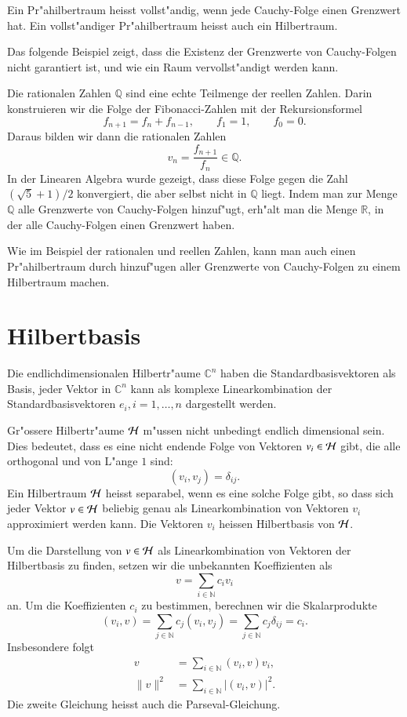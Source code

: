 \begin{definition}
Ein Pr"ahilbertraum heisst vollst"andig, wenn jede Cauchy-Folge einen
Grenzwert hat.
Ein vollst"andiger Pr"ahilbertraum heisst auch ein Hilbertraum.
\end{definition}

Das folgende Beispiel zeigt, dass die Existenz der Grenzwerte von
Cauchy-Folgen nicht garantiert ist, und wie ein Raum vervollst"andigt
werden kann.

\begin{beispiel}
Die rationalen Zahlen $\mathbb Q$ sind eine echte Teilmenge der
reellen Zahlen.
Darin konstruieren wir die Folge der Fibonacci-Zahlen mit der 
Rekursionsformel
\[
f_{n+1}=f_n+f_{n-1},\qquad f_1=1, \qquad f_0=0.
\]
Daraus bilden wir dann die rationalen Zahlen
\[
v_n=\frac{f_{n+1}}{f_n}\in\mathbb Q.
\]
In der Linearen Algebra wurde gezeigt, dass diese Folge gegen
die Zahl $(\sqrt{5}+1)/2$ konvergiert, die aber selbst nicht in
$\mathbb Q$ liegt. Indem man zur Menge $\mathbb Q$ alle Grenzwerte
von Cauchy-Folgen hinzuf"ugt, erh"alt man die Menge $\mathbb R$, in der
alle Cauchy-Folgen einen Grenzwert haben.
\end{beispiel}

Wie im Beispiel der rationalen und reellen Zahlen,
kann man auch einen Pr"ahilbertraum durch hinzuf"ugen aller Grenzwerte
von Cauchy-Folgen zu einem Hilbertraum machen.

\section{Hilbertbasis}
Die endlichdimensionalen Hilbertr"aume $\mathbb C^n$ haben die
Standardbasisvektoren als Basis, jeder Vektor in $\mathbb C^n$
kann als komplexe Linearkombination der Standardbasisvektoren
$e_i,i=1,\dots,n$ dargestellt werden.

Gr"ossere Hilbertr"aume $\cal H$ m"ussen nicht unbedingt endlich dimensional
sein. Dies bedeutet, dass es eine nicht endende Folge von Vektoren
$v_i\in\cal H$ gibt, die alle orthogonal und von L"ange $1$ sind:
\[
(v_i,v_j)=\delta_{ij}.
\]
Ein Hilbertraum $\cal H$ heisst separabel, wenn es eine solche Folge
gibt, so dass sich jeder Vektor $v\in\cal H$ beliebig genau als
Linearkombination von Vektoren $v_i$ approximiert werden kann.
Die Vektoren $v_i$ heissen Hilbertbasis von $\cal H$.

Um die Darstellung von $v\in\cal H$ als Linearkombination von Vektoren
der Hilbertbasis zu finden, setzen wir die unbekannten Koeffizienten
als 
\[
v=\sum_{i\in\mathbb N}c_iv_i
\]
an. Um die Koeffizienten $c_i$ zu bestimmen, berechnen wir die
Skalarprodukte
\[
(v_i,v)
=\sum_{j\in\mathbb N} c_j(v_i,v_j)=\sum_{j\in\mathbb N}c_j\delta_{ij}=c_i.
\]
Insbesondere folgt
\begin{align*}
v&=\sum_{i\in\mathbb N}(v_i,v) v_i,\\
\| v\|^2&=\sum_{i\in\mathbb N} |(v_i,v)|^2.
\end{align*}
Die zweite Gleichung heisst auch die Parseval-Gleichung.

